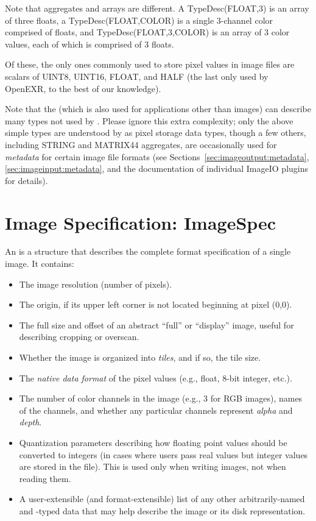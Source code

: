 Note that aggregates and arrays are different.  A {\cf
  TypeDesc(FLOAT,3)} is an array of three floats, a {\cf
  TypeDesc(FLOAT,COLOR)} is a single 3-channel color comprised of
floats, and {\cf TypeDesc(FLOAT,3,COLOR)} is an array of 3 color values,
each of which is comprised of 3 floats.
\apiend

\bigskip

Of these, the only ones commonly used to store pixel values in image files
are scalars of {\cf UINT8}, {\cf UINT16}, {\cf FLOAT}, and {\cf HALF}
(the last only used by OpenEXR, to the best of our knowledge).

Note that the \TypeDesc (which is also used for applications other
than images) can describe many types not used by
\product.  Please ignore this extra complexity; only the above simple types are understood by
\product as pixel storage data types, though a few others, including
{\cf STRING} and {\cf MATRIX44} aggregates, are occasionally used for
\emph{metadata} for certain image file formats (see
Sections~\ref{sec:imageoutput:metadata}, \ref{sec:imageinput:metadata},
and the documentation of individual ImageIO plugins for details).


\section{Image Specification: {\cf ImageSpec}}
\label{sec:ImageSpec}

An \ImageSpec is a structure that describes the complete
format specification of a single image.  It contains:

\begin{itemize}
\item The image resolution (number of pixels).
\item The origin, if its upper left corner is not located beginning at
  pixel (0,0).
\item The full size and offset of an abstract ``full'' or ``display''
  image, useful for describing cropping or overscan.
\item Whether the image is organized into \emph{tiles}, and if so, the
  tile size.
\item The \emph{native data format} of the pixel values (e.g., float, 8-bit
  integer, etc.).
\item The number of color channels in the image (e.g., 3 for RGB
  images), names of the channels, and whether any particular channels
  represent \emph{alpha} and \emph{depth}.
\item Quantization parameters describing how floating point values
  should be converted to integers (in cases where users pass real values
  but integer values are stored in the file).  This is used only when
  writing images, not when reading them.
\item A user-extensible (and format-extensible) list of any other
  arbitrarily-named and -typed data that may help describe the image or
  its disk representation.
\end{itemize}

